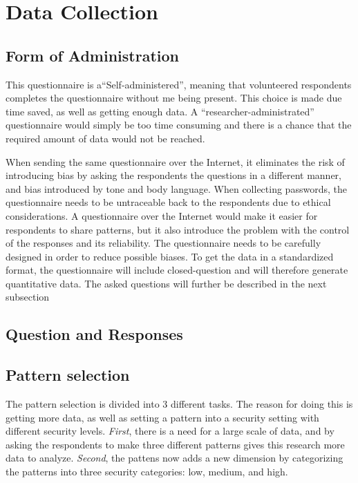 \section{Data Collection} \label{sec:datacollection}


  \subsection{Form of Administration} \label{sec:formodadministration}

  This questionnaire is a``Self-administered'', meaning that volunteered respondents completes the questionnaire without me being present. This choice is made due time saved, as well as getting enough data. A ``researcher-administrated'' questionnaire would simply be too time consuming and there is a chance that the required amount of data would not be reached. 
    
  When sending the same questionnaire over the Internet, it eliminates the risk of introducing bias by asking the respondents the questions in a different manner, and bias introduced by tone and body language. When collecting passwords, the questionnaire needs to be untraceable back to the respondents due to ethical considerations. A questionnaire over the Internet would make it easier for respondents to share patterns, but it also introduce the problem with the control of the responses and its reliability. The questionnaire needs to be carefully designed in order to reduce possible biases. To get the data in a standardized format, the questionnaire will include closed-question and will therefore generate quantitative data. The asked questions will further be described in the next subsection

  \subsection{Question and Responses}\label{sec:questions}

    \subsection*{Pattern selection}
    The pattern selection is divided into 3 different tasks. The reason for doing this is getting more data, as well as setting a pattern into a security setting with different security levels. {\it First}, there is a need for a large scale of data, and by asking the respondents to make three different patterns gives this research more data to analyze. {\it Second}, the pattens now adds a new dimension by categorizing the patterns into three security categories: low, medium, and high. 

